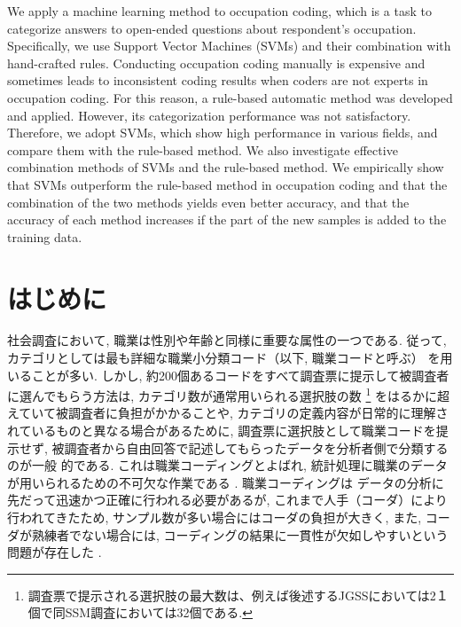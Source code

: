 \documentclass{nlp}
\begin{document}
\begin{eabstract}
We apply a machine learning method to occupation coding,
 which is a task to categorize  answers to open-ended
 questions about respondent's occupation. Specifically,
 we use Support Vector Machines (SVMs) and their combination
 with hand-crafted rules. Conducting occupation coding manually
 is expensive and sometimes leads to inconsistent coding
 results when coders are not experts in occupation coding.
 For this reason, a rule-based automatic method was developed
 and applied. However, its categorization performance was not
 satisfactory. Therefore, we adopt SVMs, which show high
 performance in various fields, and compare them with the
 rule-based method. We also investigate effective combination
 methods of SVMs and the rule-based method. We empirically show
 that SVMs outperform the rule-based method in occupation coding
 and that the combination of the two methods yields even better
 accuracy, and that the accuracy of each method increases if the
 part of the new samples is added to the training data.
\end{eabstract}


\maketitle


\section{はじめに}
\label{sec:hajime}

社会調査において, 職業は性別や年齢と同様に重要な属性の一つである. 
従って, カテゴリとしては最も詳細な職業小分類コード（以下, 職業コードと呼ぶ）
\cite{95SSM95}
を用いることが多い. 
しかし, 約200個あるコードをすべて調査票に提示して被調査者に選んでもらう方法は, 
カテゴリ数が通常用いられる選択肢の数
\footnote{調査票で提示される選択肢の最大数は、例えば後述するJGSSにおいては2１個で同SSM調査においては32個である. }
をはるかに超えていて被調査者に負担がかかることや, 
カテゴリの定義内容が日常的に理解されているものと異なる場合があるために, 
調査票に選択肢として職業コードを提示せず, 
被調査者から自由回答で記述してもらったデータを分析者側で分類するのが一般
的である. 
これは職業コーディングとよばれ, 
統計処理に職業のデータが用いられるための不可欠な作業である
\cite{Hara84}. 
職業コーディングは
データの分析に先だって迅速かつ正確に行われる必要があるが, 
これまで人手（コーダ）により行われてきたため, 
サンプル数が多い場合にはコーダの負担が大きく\cite{Hara93,95SSM95}, 
また, コーダが熟練者でない場合には, 
コーディングの結果に一貫性が欠如しやすいという問題が存在した
\cite{Takahashi00}. 
\end{document}
